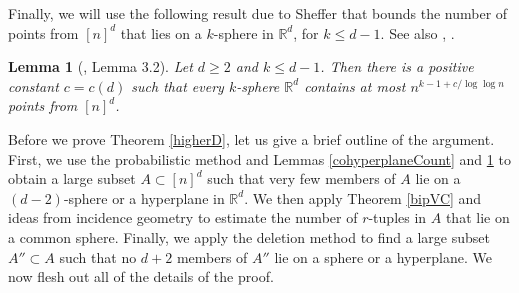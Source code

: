 \documentclass[11pt]{article}
\theoremstyle{plain}
\newtheorem{lemma}[theorem]{Lemma}
\theoremstyle{definition}
\theoremstyle{remark}
\begin{document}
%
%
Finally, we will use the following result due to Sheffer that bounds the number of points from $[n]^d$ that lies on a $k$-sphere in $\mathbb{R}^d$, for $k \leq d-1$.  See also \cite[Sec.~11.2, Equation~11.9]{iwaniec}, \cite[Theorem~2]{shel}.
%
%
%
%
\begin{lemma}[\cite{sheffer}, Lemma 3.2]\label{simplepoorCircles} Let $d \geq 2$ and $k\leq d-1$. 
 Then there is a positive constant $c = c(d)$ such that every $k$-sphere $\mathbb{R}^d$ contains at most $n^{k-1 + c/\log\log n }$ points from $[n]^d$.  
%
\end{lemma}
%
%
%
%
%
\medskip
%
%
Before we prove Theorem \ref{higherD}, let us give a brief outline of the argument.  First, we use the probabilistic method and Lemmas \ref{cohyperplaneCount} and \ref{simplepoorCircles} to obtain a large subset $A\subset [n]^d$ such that very few members of $A$ lie on a $(d-2)$-sphere or a hyperplane in $\mathbb{R}^d$.  We then apply Theorem \ref{bipVC} and ideas from incidence geometry to estimate the number of $r$-tuples in $A$ that lie on a common sphere.  Finally, we apply the deletion method to find a large subset $A'' \subset A$ such that no $d+2$ members of $A''$ lie on a sphere or a hyperplane.  We now flesh out all of the details of the proof.
\medskip
%
\end{document}

